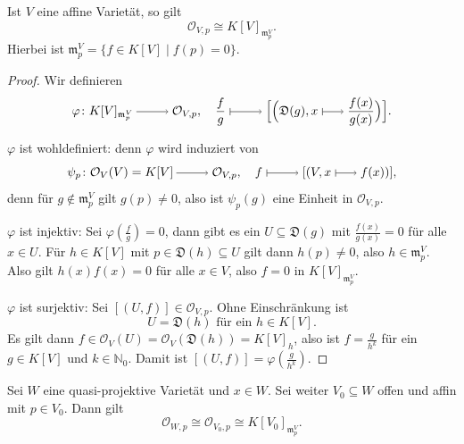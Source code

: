 \documentclass[a4paper,12pt,index=toc]{scrbook}
\theoremstyle{keinenummern} %
\def\O{\mathcal{O}}
\newcommand{\D}{\mathfrak{D}}
\def\m{\mathfrak{m}}
\renewcommand{\phi}{\varphi}
\newcommand{\set}[1]{\ensuremath{\mathbb{#1}}}
\newcommand{\N}{\set{N}}
\begin{document}
\begin{prop}\label{3.1.5}
  Ist $V$ eine affine Varietät, so gilt \[ \O_{V,p}\cong K[V]_{\m_p^V}. \]
  Hierbei ist $\m_p^V = \{ f\in K[V] \mid f(p)=0\}$.
\end{prop}
\begin{proof}
  Wir definieren
  \[ \phi\colon K[V]_{\m_p^V}\ra\O_{V,p},\quad\frac{f}{g}\mapsto\Bigl[\Bigl(\D(g),x\smapsto\frac{f(x)}{g(x)}\Bigr)\Bigr]. \]

  $\phi$ ist wohldefiniert: denn $\phi$ wird induziert von
  \[ \psi_p\colon \O_V(V)=K[V]\ra\O_{V,p},\quad f\mapsto[(V,x\smapsto f(x))], \]
  denn für $g\notin \m_p^V$ gilt $g(p)\neq0$, also ist $\psi_p(g)$ eine Einheit in $\O_{V,p}$.

  $\phi$ ist injektiv: Sei $\phi(\frac{f}{g})=0$, dann gibt es ein $U\subseteq\D(g)$ mit $\frac{f(x)}{g(x)}=0$ für alle $x\in
  U$. Für $h\in K[V]$ mit $p\in\D(h)\subseteq U$ gilt dann $h(p)\neq0$, also $h\in \m_p^V$. Also gilt $h(x)f(x)=0$ für alle
  $x\in V$, also $f=0$ in $K[V]_{\m_p^V}$.

  $\phi$ ist surjektiv: Sei $[(U,f)]\in\O_{V,p}$. Ohne Einschränkung ist \[U=\D(h)\text{ für ein }h\in K[V].\] Es gilt dann
  $f\in\O_V(U)=\O_V(\D(h))=K[V]_h$, also ist $f=\frac{g}{h^k}$ für ein $g\in K[V]$ und $k\in\N_0$. Damit ist
  $[(U,f)]=\phi(\frac{g}{h^k})$.  
\end{proof}

\begin{kor}\label{3.1.6}
  Sei $W$ eine quasi-projektive Varietät und $x\in W$. Sei weiter $V_0\subseteq W$ offen und affin mit $p\in V_0$. Dann gilt
  \[ \O_{W,p} \cong \O_{V_0,p} \cong K[V_0]_{\m_p^V}. \]
\end{kor}
\end{document}
